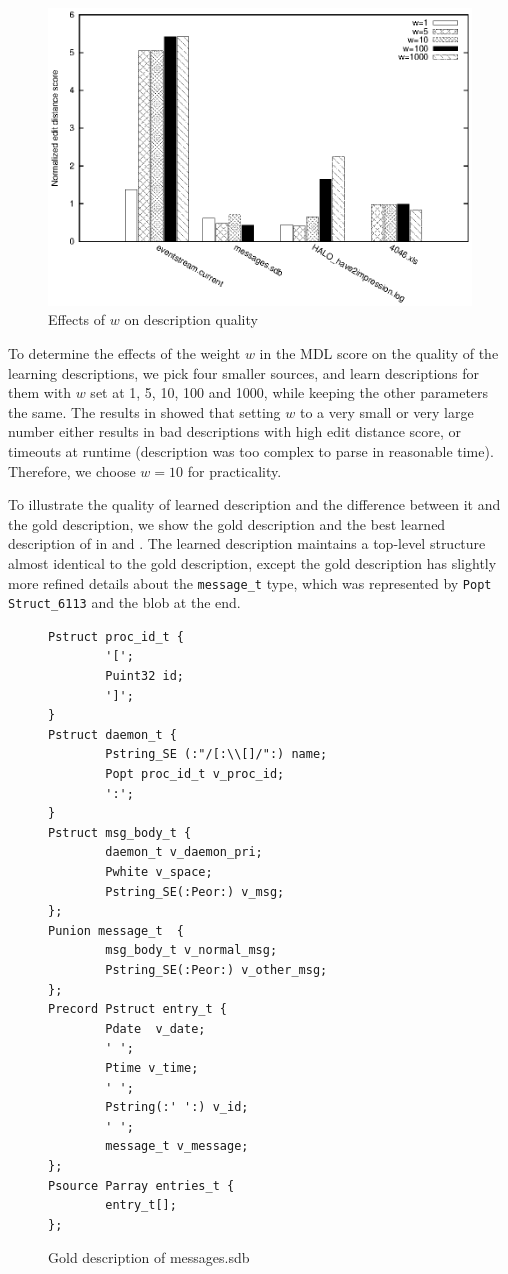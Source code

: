 \begin{figure}[th]
\centering
\includegraphics[width=\columnwidth]{adc}
\caption{Effects of $w$ on description quality}
\label{fig:adc}
\end{figure}

To determine the effects of the weight $w$ in the MDL score on the quality
of the learning descriptions, we pick four smaller sources, and learn
descriptions for them with $w$ set at 1, 5, 10, 100 and 1000, while
keeping the other parameters the same. The results in 
showed that setting $w$ to a very small or very large number either
results in bad descriptions with high edit distance score, or
timeouts at runtime (description was too complex to parse in reasonable time).
Therefore, we choose $w = 10$ for practicality.

To illustrate the quality of learned description and the difference between it
and the gold description, we show the gold description and the best
learned description of  in 
and . The learned description maintains a top-level
structure almost identical to the gold description, except the gold description
has slightly more refined details about the {\tt message\_t} type, which was
represented by {\tt Popt Struct\_6113} and the blob at the end.

\begin{figure}[t]
\centering
{\footnotesize
\begin{verbatim}
Pstruct proc_id_t {
        '[';
        Puint32 id;
        ']';
}
Pstruct daemon_t {
        Pstring_SE (:"/[:\\[]/":) name;
        Popt proc_id_t v_proc_id;
        ':';
}
Pstruct msg_body_t {
        daemon_t v_daemon_pri;
        Pwhite v_space;
        Pstring_SE(:Peor:) v_msg;
};
Punion message_t  {
        msg_body_t v_normal_msg;
        Pstring_SE(:Peor:) v_other_msg;
};
Precord Pstruct entry_t {
        Pdate  v_date;
        ' ';
        Ptime v_time;
        ' ';
        Pstring(:' ':) v_id;
        ' ';
        message_t v_message;
};
Psource Parray entries_t {
        entry_t[];
};
\end{verbatim}
}
\caption{Gold description of messages.sdb}
\label{fig:gold-messages.sdb}
\end{figure}

